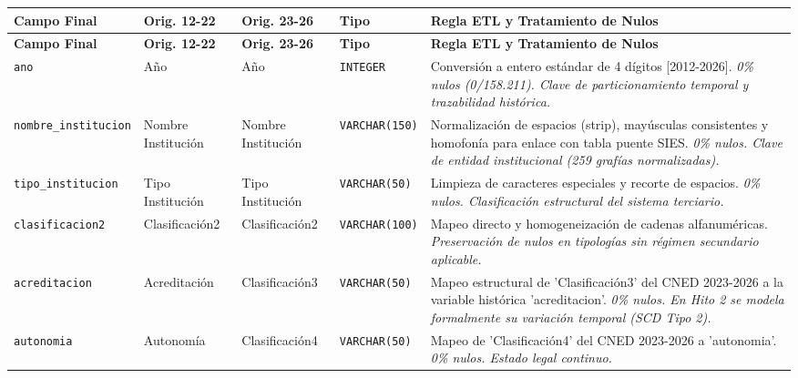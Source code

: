 {\small
\begin{longtable}{|p{3.0cm}|p{2.0cm}|p{2.0cm}|p{1.6cm}|p{6.4cm}|}
\hline
\textbf{Campo Final} & \textbf{Orig. 12-22} & \textbf{Orig. 23-26} & \textbf{Tipo} & \textbf{Regla ETL y Tratamiento de Nulos} \\
\hline\endfirsthead
\hline \textbf{Campo Final} & \textbf{Orig. 12-22} & \textbf{Orig. 23-26} & \textbf{Tipo} & \textbf{Regla ETL y Tratamiento de Nulos} \\ \hline \endhead
\texttt{\footnotesize ano} & Año & Año & \texttt{\footnotesize INTEGER} & Conversión a entero estándar de 4 dígitos [2012-2026]. \newline \textit{\footnotesize 0\% nulos (0/158.211). Clave de particionamiento temporal y trazabilidad histórica.} \\
\hline
\texttt{\footnotesize nombre\_institucion} & Nombre Institución & Nombre Institución & \texttt{\footnotesize VARCHAR(150)} & Normalización de espacios (strip), mayúsculas consistentes y homofonía para enlace con tabla puente SIES. \newline \textit{\footnotesize 0\% nulos. Clave de entidad institucional (259 grafías normalizadas).} \\
\hline
\texttt{\footnotesize tipo\_institucion} & Tipo Institución & Tipo Institución & \texttt{\footnotesize VARCHAR(50)} & Limpieza de caracteres especiales y recorte de espacios. \newline \textit{\footnotesize 0\% nulos. Clasificación estructural del sistema terciario.} \\
\hline
\texttt{\footnotesize clasificacion2} & Clasificación2 & Clasificación2 & \texttt{\footnotesize VARCHAR(100)} & Mapeo directo y homogeneización de cadenas alfanuméricas. \newline \textit{\footnotesize Preservación de nulos en tipologías sin régimen secundario aplicable.} \\
\hline
\texttt{\footnotesize acreditacion} & Acreditación & Clasificación3 & \texttt{\footnotesize VARCHAR(50)} & Mapeo estructural de 'Clasificación3' del CNED 2023-2026 a la variable histórica 'acreditacion'. \newline \textit{\footnotesize 0\% nulos. En Hito 2 se modela formalmente su variación temporal (SCD Tipo 2).} \\
\hline
\texttt{\footnotesize autonomia} & Autonomía & Clasificación4 & \texttt{\footnotesize VARCHAR(50)} & Mapeo de 'Clasificación4' del CNED 2023-2026 a 'autonomia'. \newline \textit{\footnotesize 0\% nulos. Estado legal continuo.} \\

\end{longtable}}
